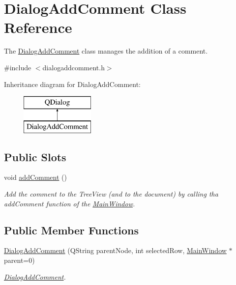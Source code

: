 \hypertarget{classDialogAddComment}{\section{Dialog\-Add\-Comment Class Reference}
\label{classDialogAddComment}
}


The \hyperlink{classDialogAddComment}{Dialog\-Add\-Comment} class manages the addition of a comment.  




{\ttfamily \#include $<$dialogaddcomment.\-h$>$}

Inheritance diagram for Dialog\-Add\-Comment\-:\begin{figure}[H]
\begin{center}
\leavevmode
\includegraphics[height=2.000000cm]{classDialogAddComment}
\end{center}
\end{figure}
\subsection*{Public Slots}
\begin{DoxyCompactItemize}
\item 
\hypertarget{classDialogAddComment_a78aac814a6aa24e09b45730b601a99db}{void \hyperlink{classDialogAddComment_a78aac814a6aa24e09b45730b601a99db}{add\-Comment} ()}\label{classDialogAddComment_a78aac814a6aa24e09b45730b601a99db}

\begin{DoxyCompactList}\small\item\em Add the comment to the Tree\-View (and to the document) by calling tha add\-Comment function of the \hyperlink{classMainWindow}{Main\-Window}. \end{DoxyCompactList}\end{DoxyCompactItemize}
\subsection*{Public Member Functions}
\begin{DoxyCompactItemize}
\item 
\hyperlink{classDialogAddComment_ad0cdceadc62c07e6fba1e0a2f2ab71eb}{Dialog\-Add\-Comment} (Q\-String parent\-Node, int selected\-Row, \hyperlink{classMainWindow}{Main\-Window} $\ast$parent=0)
\begin{DoxyCompactList}\small\item\em \hyperlink{classDialogAddComment}{Dialog\-Add\-Comment}. \end{DoxyCompactList}\end{DoxyCompactItemize}
